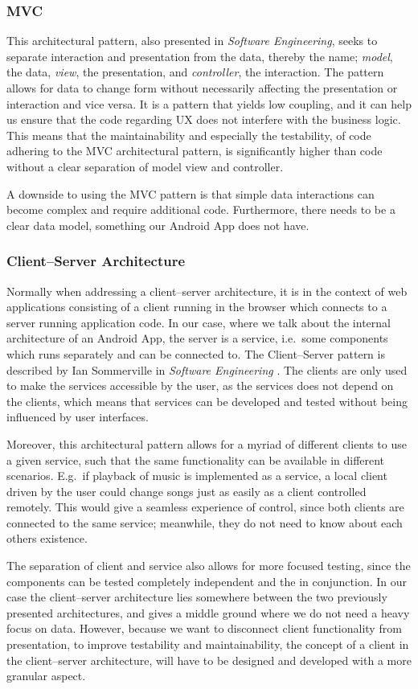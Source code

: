 \subsubsection{\acl{MVC}}
This architectural pattern, also presented in \textit{Software Engineering}\cite[p. 176]{sommerville}, seeks to separate interaction and presentation from the data, thereby the name; \textit{model}, the data, \textit{view}, the presentation, and \textit{controller}, the interaction.
The pattern allows for data to change form without necessarily affecting the presentation or interaction and vice versa.
It is a pattern that yields low coupling, and it can help us ensure that the code regarding \ac{UX} does not interfere with the business logic.
This means that the maintainability and especially the testability, of code adhering to the \ac{MVC} architectural pattern, is significantly higher than code without a clear separation of model view and controller.

A downside to using the MVC pattern is that simple data interactions can become complex and require additional code.
Furthermore, there needs to be a clear data model, something our Android App does not have.

\subsubsection{Client--Server Architecture}
Normally when addressing a client--server architecture, it is in the context of web applications consisting of a client running in the browser which connects to a server running application code.
In our case, where we talk about the internal architecture of an Android App, the server is a service, i.e.~some components which runs separately and can be connected to.
The Client--Server pattern is described by Ian Sommerville in \textit{Software Engineering} \cite[p. 180-181]{sommerville}.
The clients are only used to make the services accessible by the user, as the services does not depend on the clients, which means that services can be developed and tested without being influenced by user interfaces.

Moreover, this architectural pattern allows for a myriad of different clients to use a given service, such that the same functionality can be available in different scenarios.
E.g.~if playback of music is implemented as a service, a local client driven by the user could change songs just as easily as a client controlled remotely.
This would give a seamless experience of control, since both clients are connected to the same service; meanwhile, they do not need to know about each others existence.

The separation of client and service also allows for more focused testing, since the components can be tested completely independent and the in conjunction.
In our case the client--server architecture lies somewhere between the two previously presented architectures, and gives a middle ground where we do not need a heavy focus on data.
However, because we want to disconnect client functionality from presentation, to improve testability and maintainability, the concept of a client in the client--server architecture, will have to be designed and developed with a more granular aspect.

